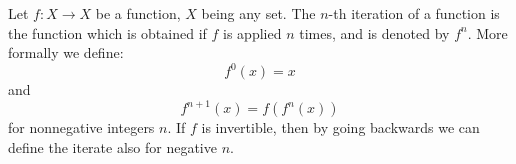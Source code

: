 \documentclass[12pt]{article}
\begin{document}
Let $f\colon X\to X$ be a function, $X$ being any set. The $n$-th iteration of a function is the function which is obtained if $f$ is applied $n$ times, and is denoted by $f^n$. More formally we define:
$$f^0(x)=x$$
and
$$f^{n+1}(x)=f(f^n(x))$$
for nonnegative integers $n$. If $f$ is invertible, then by going backwards we can define the iterate also for negative $n$.
\end{document}
